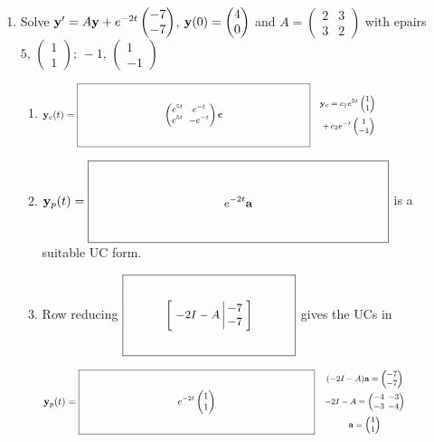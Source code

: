 \documentclass[12pt,letterpaper]{article}
\newcommand{\KeyBox}[3]{\vcenter{\hbox{$\boxed{\parbox[c][#2][c]{#1}{\centering\small\setlength{\arraycolsep}{3pt}\ensuremath{\displaystyle #3}}}$}}}
\newcommand{\KeySide}[2]{\quad\vcenter{\hbox{\parbox{#1}{\footnotesize\setlength{\arraycolsep}{2pt}\ensuremath{\begin{gathered}#2\end{gathered}}}}}}
\begin{document}
\begin{enumerate}
\item \begingroup
\setlength{\arraycolsep}{3pt}
Solve
$
  \mathbf{y}'=A\mathbf{y}+e^{-2t}\begin{pmatrix}-7\\-7\end{pmatrix}
  $, $\mathbf{y}(0)=\begin{pmatrix}4\\0\end{pmatrix}$
and
$A=\begin{pmatrix}2&3\\3&2\end{pmatrix}$ with epairs
$
  5,\, \begin{pmatrix}1\\1\end{pmatrix};\, -1,\, \begin{pmatrix}1\\-1\end{pmatrix}
$
\endgroup
\begin{enumerate}
\item $\vect{y}_c(t)=\KeyBox{3.2in}{0.80in}{\begin{pmatrix}e^{5t}&e^{-t}\\e^{5t}&-e^{-t}\end{pmatrix}\vect{c}}\KeySide{2.5in}{\vect{y}_c=c_1e^{5t}\begin{pmatrix}1\\1\end{pmatrix}\\{}+c_2e^{-t}\begin{pmatrix}1\\-1\end{pmatrix}}$
\item $\vect{y}_p(t)=\KeyBox{3.2in}{0.80in}{e^{-2t}\vect{a}}$
is a suitable UC form.
\item Row reducing
$\KeyBox{1.8in}{0.80in}{\left[\begin{array}{c|c}-2I-A&\begin{matrix}-7\\-7\end{matrix}\end{array}\right]}$\hspace{0.12in} gives the UCs in
\par
$\vect{y}_p(t)=\KeyBox{3.2in}{0.80in}{e^{-2t}\begin{pmatrix}1\\1\end{pmatrix}}\KeySide{2.4in}{(-2I-A)\vect{a}=\begin{pmatrix}-7\\-7\end{pmatrix}\\-2I-A=\begin{pmatrix}-4&-3\\-3&-4\end{pmatrix}\\\vect{a}=\begin{pmatrix}1\\1\end{pmatrix}}$

\end{enumerate}
\end{enumerate}
\end{document}
